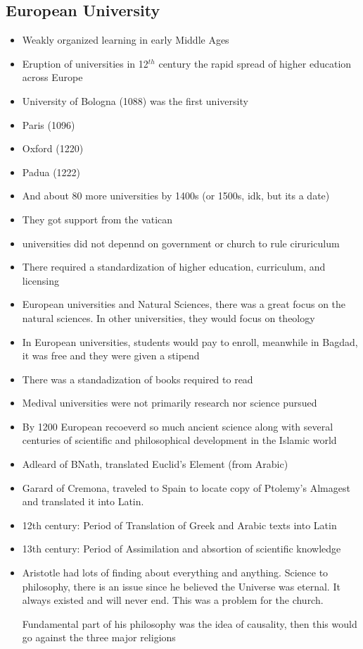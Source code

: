 \documentclass{article}
\begin{document}
\subsection{European University}
\begin{itemize}
  \item Weakly organized learning in early Middle Ages
  \item Eruption of universities in 12$^{th}$ century the rapid spread of
    higher education across Europe
  \item University of Bologna (1088) was the first university
  \item Paris (1096)
  \item Oxford (1220)
  \item Padua (1222)
  \item And about 80 more universities by 1400s (or 1500s, idk, but its a date)
  \item They got support from the vatican
  \item universities did not depennd on government or church to rule ciruriculum
  \item There required a standardization of higher education, curriculum, and licensing
  \item European universities and Natural Sciences, there was a great focus
    on the natural sciences. In other universities, they would focus on theology
  \item In European universities, students would pay to enroll, meanwhile
    in Bagdad, it was free and they were given a stipend
  \item There was a standadization of books required to read
  \item Medival universities were not primarily research nor science pursued
  \item By 1200 European recoeverd so much ancient science along with
    several centuries of scientific and philosophical development in the Islamic world
  \item Adleard of BNath, translated Euclid's Element (from Arabic)
  \item Garard of Cremona, traveled to Spain to locate copy of Ptolemy's Almagest
    and translated it into Latin.
  \item 12th century: Period of Translation of Greek and Arabic texts into Latin
  \item 13th century: Period of Assimilation and absortion of scientific knowledge
  \item Aristotle had lots of finding about everything and anything. Science to philosophy,
    there is an issue since he believed the Universe was eternal.
    It always existed and will never end. This was a problem for the church.

    Fundamental part of his philosophy was the idea of causality, then this would
    go against the three major religions
\end{itemize}
\end{document}

